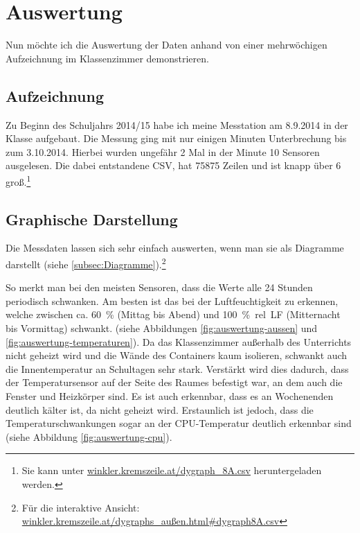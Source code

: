 \chapter{Auswertung}
\label{cha:Auswertung}

Nun möchte ich die Auswertung der Daten anhand von einer mehrwöchigen Aufzeichnung im Klassenzimmer demonstrieren.

\section{Aufzeichnung}
\label{auswertung_aufzeichnung}

Zu Beginn des Schuljahrs 2014/15 habe ich meine Messtation am 8.9.2014 in der Klasse aufgebaut. Die Messung ging mit nur einigen Minuten Unterbrechung bis zum 3.10.2014. Hierbei wurden ungefähr 2 Mal in der Minute 10 Sensoren ausgelesen. Die dabei entstandene \gls{CSV}, hat 75875 Zeilen und ist knapp über \SI{6}{\mega\byte} groß.\footnote{Sie kann unter \href{http://winkler.kremszeile.at/dygraph_8A.csv}{winkler.kremszeile.at/dygraph\_8A.csv} heruntergeladen werden.}

\section{Graphische Darstellung}

Die Messdaten lassen sich sehr einfach auswerten, wenn man sie als Diagramme darstellt (siehe \ref{subsec:Diagramme}).\footnote{Für die interaktive Ansicht: \href{http://winkler.kremszeile.at/dygraphs_au\%C3\%9Fen.html\#dygraph8A.csv}{winkler.kremszeile.at/dygraphs\_außen.html\#dygraph8A.csv}}

So merkt man bei den meisten Sensoren, dass die Werte alle 24 Stunden periodisch schwanken. Am besten ist das bei der Luftfeuchtigkeit zu erkennen, welche zwischen ca. \SI{60}{\%} (Mittag bis Abend) und \SI{100}{\%.rel.LF} (Mitternacht bis Vormittag) schwankt. (siehe Abbildungen \ref{fig:auswertung-aussen} und \ref{fig:auswertung-temperaturen}).
Da das Klassenzimmer außerhalb des Unterrichts nicht geheizt wird und die Wände des Containers kaum isolieren, schwankt auch die Innentemperatur an Schultagen sehr stark. Verstärkt wird dies dadurch, dass der Temperatursensor auf der Seite des Raumes befestigt war, an dem auch die Fenster und Heizkörper sind. Es ist auch erkennbar, dass es an Wochenenden deutlich kälter  ist, da nicht geheizt wird. 
Erstaunlich ist jedoch, dass die Temperaturschwankungen sogar an der \gls{CPU}-Temperatur deutlich erkennbar sind (siehe Abbildung \ref{fig:auswertung-cpu}).

